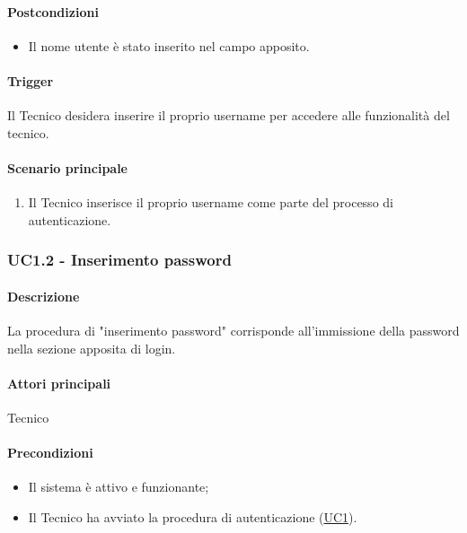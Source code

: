 \paragraph*{Postcondizioni}
\begin{itemize}
  \item Il nome utente è stato inserito nel campo apposito.
\end{itemize}

\paragraph*{Trigger}
Il Tecnico desidera inserire il proprio username per accedere alle funzionalità del tecnico.

\paragraph*{Scenario principale}
\begin{enumerate}
  \item Il Tecnico inserisce il proprio username come parte del processo di autenticazione.
\end{enumerate}


\subsubsection{UC1.2 - Inserimento password}\label{UC1point2}
\paragraph*{Descrizione}
La procedura di "inserimento password" corrisponde all'immissione della password nella sezione apposita di login.

\paragraph*{Attori principali}
Tecnico

\paragraph*{Precondizioni}
\begin{itemize}
  \item Il sistema è attivo e funzionante;
  \item Il Tecnico ha avviato la procedura di autenticazione (\hyperref[UC1]{UC1}). 
\end{itemize}


